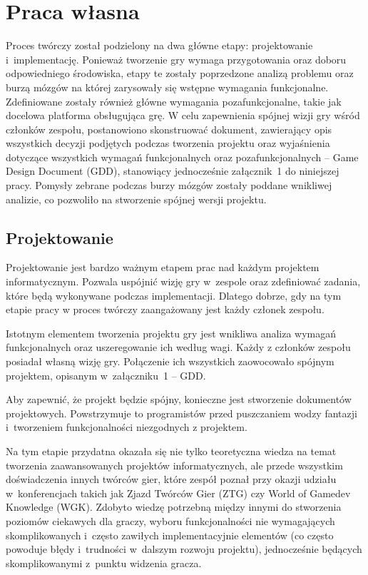 \chapter{Praca własna}
Proces twórczy został podzielony na dwa główne etapy: projektowanie i~implementację. Ponieważ tworzenie gry wymaga przygotowania oraz doboru odpowiedniego środowiska, etapy te zostały poprzedzone analizą problemu oraz burzą mózgów na której zarysowały się wstępne wymagania funkcjonalne. Zdefiniowane zostały również główne wymagania pozafunkcjonalne, takie jak docelowa platforma obsługująca grę. W celu zapewnienia spójnej wizji gry wśród członków zespołu, postanowiono skonstruować dokument, zawierający opis wszystkich decyzji podjętych podczas tworzenia projektu oraz wyjaśnienia dotyczące wszystkich wymagań funkcjonalnych oraz pozafunkcjonalnych -- Game Design Document (GDD), stanowiący jednocześnie załącznik~1 do niniejszej pracy.  Pomysły zebrane podczas burzy mózgów zostały poddane wnikliwej analizie, co pozwoliło na stworzenie spójnej wersji projektu. 

\section{Projektowanie}
Projektowanie jest bardzo ważnym etapem prac nad każdym projektem informatycznym. Pozwala uspójnić wizję gry w~zespole oraz zdefiniować zadania, które będą wykonywane podczas implementacji. Dlatego dobrze, gdy na tym etapie pracy w proces twórczy zaangażowany jest każdy członek zespołu. 

Istotnym elementem tworzenia projektu gry jest wnikliwa analiza wymagań funkcjonalnych oraz uszeregowanie ich według wagi. Każdy z członków zespołu posiadał własną wizję gry. Połączenie ich wszystkich zaowocowało spójnym projektem, opisanym w~załączniku~1 -- GDD. 

Aby zapewnić, że projekt będzie spójny, konieczne jest stworzenie dokumentów projektowych. Powstrzymuje to programistów przed puszczaniem wodzy fantazji i~tworzeniem funkcjonalności niezgodnych z projektem. 

Na tym etapie przydatna okazała się nie tylko teoretyczna wiedza na temat tworzenia zaawansowanych projektów informatycznych, ale przede wszystkim doświadczenia innych twórców gier, które zespół poznał przy okazji udziału w~konferencjach takich jak Zjazd Twórców Gier (ZTG) czy World of Gamedev Knowledge (WGK). Zdobyto wiedzę potrzebną między innymi do stworzenia poziomów ciekawych dla graczy, wyboru funkcjonalności nie wymagających skomplikowanych i~często zawiłych implementacyjnie elementów (co często powoduje błędy i~trudności w~dalszym rozwoju projektu), jednocześnie będących skomplikowanymi z~punktu widzenia gracza. 

